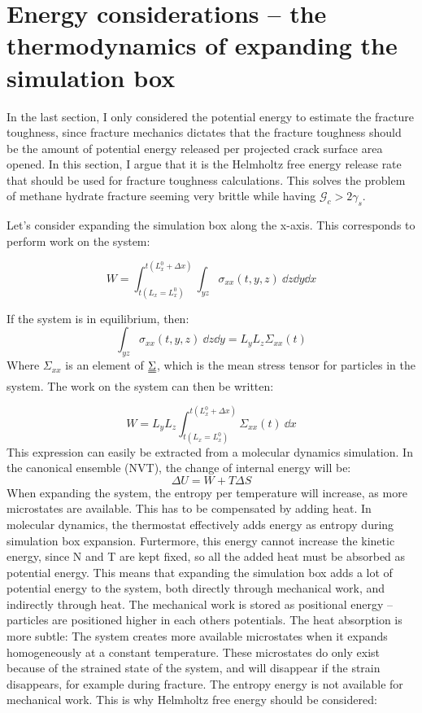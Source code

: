 \section{Energy considerations -- the thermodynamics of expanding the simulation box}
In the last section, I only considered the potential energy to estimate the fracture toughness, since fracture mechanics dictates that the fracture toughness should be the amount of potential energy released per projected crack surface area opened. In this section, I argue that it is the Helmholtz free energy release rate that should be used for fracture toughness calculations. This solves the problem of methane hydrate fracture seeming very brittle while having $\mathcal{G}_c > 2\gamma_s$.

Let's consider expanding the simulation box along the x-axis. This corresponds to perform work on the system:

\begin{equation}
	W = \int_{t(L_x = L_x^0)}^{t(L_x^0 + \Delta x)} \int_{yz} \sigma_{xx} (t, y, z) \ \dd z \dd y \dd x
\end{equation}

If the system is in equilibrium, then:
\begin{equation}
\int_{yz} \sigma_{xx} (t, y, z) \ \dd z \dd y = L_yL_z\Sigma_{xx}(t)	
\end{equation}
Where $\Sigma_{xx}$ is an element of $\uuline \Sigma$, which is the mean stress tensor for particles in the system. The work on the system can then be written:

\begin{equation}
	W = L_y L_z \int_{t(L_x = L_x^0)}^{t(L_x^0 + \Delta x)} \Sigma_{xx}(t) \ \dd x
\end{equation}
This expression can easily be extracted from a molecular dynamics simulation.
In the canonical ensemble (NVT), the change of internal energy will be:
\begin{equation}
	\Delta U = W + T\Delta S
\end{equation}
When expanding the system, the entropy per temperature will increase, as more microstates are available. This has to be compensated by adding heat. In molecular dynamics, the thermostat effectively adds energy as entropy during simulation box expansion. Furtermore, this energy cannot increase the kinetic energy, since N and T are kept fixed, so all the added heat must be absorbed as potential energy. This means that expanding the simulation box adds a lot of potential energy to the system, both directly through mechanical work, and indirectly through heat. The mechanical work is stored as positional energy -- particles are positioned higher in each others potentials. The heat absorption is more subtle: The system creates more available microstates when it expands homogeneously at a constant temperature. These microstates do only exist because of the strained state of the system, and will disappear if the strain disappears, for example during fracture. The entropy energy is not available for mechanical work. This is why Helmholtz free energy should be considered:

